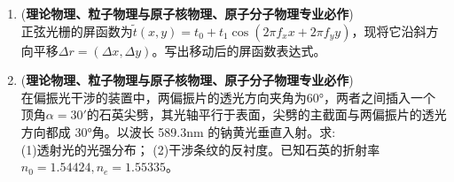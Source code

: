 \begin{enumerate}
\item (\textbf{理论物理、粒子物理与原子核物理、原子分子物理专业必作})\\
正弦光栅的屏函数为$\widetilde t(x,y)=t_0+t_1\cos(2\pi f_x x+2\pi f_y y)$，现将它沿斜方向平移$\Delta r=(\Delta x,\Delta y)$。写出移动后的屏函数表达式。
\item (\textbf{理论物理、粒子物理与原子核物理、原子分子物理专业必作})\\
在偏振光干涉的装置中，两偏振片的透光方向夹角为60°，两者之间插入一个顶角$\alpha=30'$的石英尖劈，其光轴平行于表面，尖劈的主截面与两偏振片的透光方向都成 30°角。以波长 589.3nm 的钠黄光垂直入射。求:\\
(1)透射光的光强分布；
(2)干涉条纹的反衬度。已知石英的折射率$n_0=1.54424,n_e=1.55335$。
\end{enumerate}